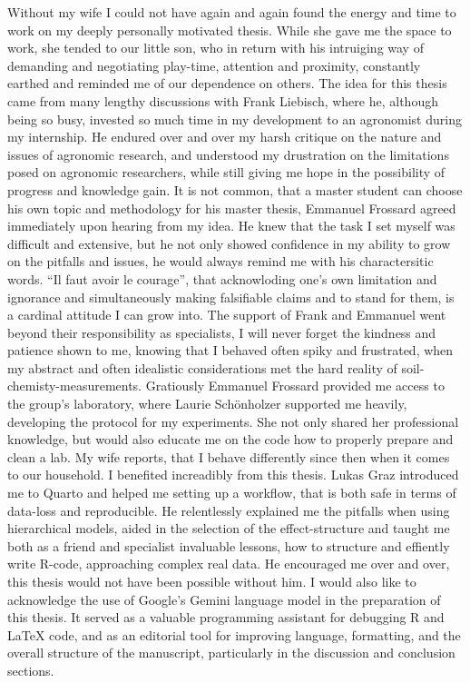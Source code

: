 \documentclass[
  a4paper,
]{article}
\begin{document}
Without my wife I could not have again and again found the energy and
time to work on my deeply personally motivated thesis. While she gave me
the space to work, she tended to our little son, who in return with his
intruiging way of demanding and negotiating play-time, attention and
proximity, constantly earthed and reminded me of our dependence on
others. The idea for this thesis came from many lengthy discussions with
Frank Liebisch, where he, although being so busy, invested so much time
in my development to an agronomist during my internship. He endured over
and over my harsh critique on the nature and issues of agronomic
research, and understood my drustration on the limitations posed on
agronomic researchers, while still giving me hope in the possibility of
progress and knowledge gain. It is not common, that a master student can
choose his own topic and methodology for his master thesis, Emmanuel
Frossard agreed immediately upon hearing from my idea. He knew that the
task I set myself was difficult and extensive, but he not only showed
confidence in my ability to grow on the pitfalls and issues, he would
always remind me with his charactersitic words. ``Il faut avoir le
courage'', that acknowloding one's own limitation and ignorance and
simultaneously making falsifiable claims and to stand for them, is a
cardinal attitude I can grow into. The support of Frank and Emmanuel
went beyond their responsibility as specialists, I will never forget the
kindness and patience shown to me, knowing that I behaved often spiky
and frustrated, when my abstract and often idealistic considerations met
the hard reality of soil-chemisty-measurements. Gratiously Emmanuel
Frossard provided me access to the group's laboratory, where Laurie
Schönholzer supported me heavily, developing the protocol for my
experiments. She not only shared her professional knowledge, but would
also educate me on the code how to properly prepare and clean a lab. My
wife reports, that I behave differently since then when it comes to our
household. I benefited increadibly from this thesis. Lukas Graz
introduced me to Quarto and helped me setting up a workflow, that is
both safe in terms of data-loss and reproducible. He relentlessly
explained me the pitfalls when using hierarchical models, aided in the
selection of the effect-structure and taught me both as a friend and
specialist invaluable lessons, how to structure and effiently write
R-code, approaching complex real data. He encouraged me over and over,
this thesis would not have been possible without him. I would also like
to acknowledge the use of Google's Gemini language model in the
preparation of this thesis. It served as a valuable programming
assistant for debugging R and LaTeX code, and as an editorial tool for
improving language, formatting, and the overall structure of the
manuscript, particularly in the discussion and conclusion sections.
\end{document}
